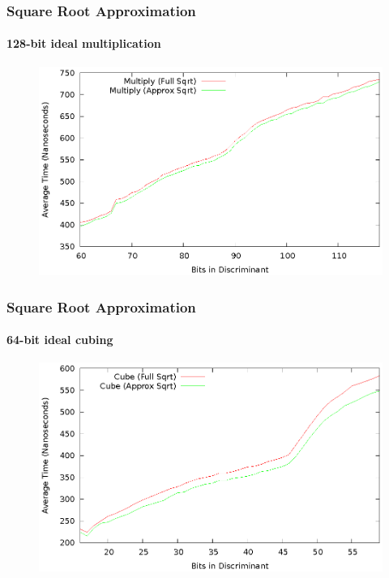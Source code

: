 \documentclass{beamer}
\begin{document}
\begin{frame}
\frametitle{Square Root Approximation}
\framesubtitle{128-bit ideal multiplication}
\begin{figure}
\includegraphics[scale=0.86]{compose-sqrtopt-128}
\end{figure}
\end{frame}

\begin{frame}
\frametitle{Square Root Approximation}
\framesubtitle{64-bit ideal cubing}
\begin{figure}
\includegraphics[scale=0.86]{cube-sqrtopt-64}
\end{figure}
\end{frame}
\end{document}
